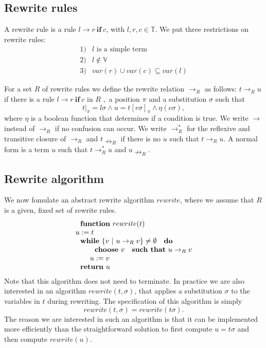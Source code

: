 \documentclass{article}
\begin{document}
\subsection{Rewrite rules}

A rewrite rule is a rule $l\rightarrow r\ \mathbf{if}\ c$, with $l,r,c\in 
\mathbb{T}$. We put three restrictions on rewrite rules:%
\begin{equation*}
\begin{array}{ll}
1) & l\text{ is a simple term} \\ 
2) & l\notin \mathbb{V} \\ 
3) & var(r)\cup var(c)\subseteq var(l)%
\end{array}%
\end{equation*}

For a set $R$ of rewrite rules we define the rewrite relation $\rightarrow
_{R}$ as follows: $t\rightarrow _{R}u$ if there is a rule $l\rightarrow r\ 
\mathbf{if}\ c$ in $R$ $,$ a position $\pi $ and a substitution $\sigma $
such that%
\begin{equation}
t|_{\pi }=l\sigma \wedge u=t[r\sigma ]_{\pi }\wedge \eta (c\sigma ),
\label{eq:rewriting}
\end{equation}%
where $\eta $ is a boolean function that determines if a condition is true.
We write $\rightarrow $ instead of $\rightarrow _{R}$ if no confusion can
occur. We write $\rightarrow _{R}^{\ast }$ for the reflexive and transitive
closure of $\rightarrow _{R}$ and $t\nrightarrow _{R}$ if there is no $u$
such that $t\rightarrow _{R}u$. A normal form is a term $u$ such that $%
t\rightarrow _{R}^{\ast }u$ and $u\nrightarrow _{R}$.

\subsection{Rewrite algorithm}

We now fomulate an abstract rewrite algorithm $rewrite$, where we assume
that $R$ is a given, fixed set of rewrite rules.%
\begin{equation*}
\begin{array}{l}
\text{\textbf{function} }rewrite(t) \\ 
u:=t \\ 
\text{\textbf{while} }\{v\ |\ u\rightarrow _{R}v\}\neq \emptyset \text{ 
\textbf{do}} \\ 
\qquad \text{\textbf{choose} }v\text{ \textbf{such that} }u\rightarrow _{R}v
\\ 
\qquad u:=v \\ 
\text{\textbf{return} }u%
\end{array}%
\end{equation*}%
Note that this algorithm does not need to terminate. In practice we are also
interested in an algorithm $rewrite(t,\sigma )$, that applies a substitution 
$\sigma $ to the variables in $t$ during rewriting. The specification of
this algorithm is simply%
\begin{equation*}
rewrite(t,\sigma )=rewrite(t\sigma ).
\end{equation*}%
The reason we are interested in such an algorithm is that it can be
implemented more efficiently than the straightforward solution to first
compute $u=t\sigma $ and then compute $rewrite(u)$.
\end{document}

